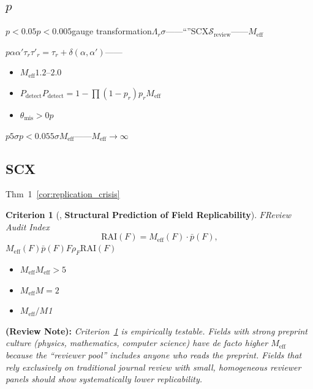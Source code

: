 \documentclass[12pt,a4paper]{article}
\newtheorem{criterion}[theorem]{Criterion}
\theoremstyle{remark}
\newcommand{\reviewSurf}{\mathcal{S}_{\text{review}}}
\newcommand{\misalignAngle}{\theta_{\text{mis}}}
\newcommand{\detectProb}{P_{\text{detect}}}
\newcommand{\reviewnote}[1]{%
    \medskip\noindent
    \textbf{ (Review Note):} \textit{#1}%
}
\begin{document}
\subsection{$p$}

$p < 0.05$$p < 0.005$\textbf{}gauge transformation$\Lambda_r$$\sigma$——``''SCX$\reviewSurf$\textit{}\textit{}——$M_{\text{eff}}$

$p$$\alpha$$\alpha'$$\tau_r$$\tau'_r = \tau_r + \delta(\alpha, \alpha')$\textit{}——
\begin{itemize}
    \item $M_{\text{eff}}$$1.2$--$2.0$
    \item $\detectProb$$\detectProb = 1 - \prod(1-p_r)$$p_r$$M_{\text{eff}}$
    \item $\misalignAngle > 0$$p$
\end{itemize}

\begin{honestcrit}{$p$$5\sigma$$p < 0.05$$5\sigma$$M_{\text{eff}}$——\textit{}$M_{\text{eff}} \to \infty$}
\end{honestcrit}

\subsection{SCX}

Thm~1~\ref{cor:replication_crisis}

\begin{criterion}[, \textbf{Structural Prediction of Field Replicability}]
\label{criterion:replicability}
$F$\textbf{}Review Audit Index
\begin{equation}
    \text{RAI}(F) = M_{\text{eff}}(F) \cdot \bar{p}(F),
    \label{eq:RAI}
\end{equation}
$M_{\text{eff}}(F)$$\bar{p}(F)$$F$$\rho_F$$\text{RAI}(F)$
\begin{itemize}
    \item $M_{\text{eff}}$$M_{\text{eff}} > 5$
    \item $M_{\text{eff}}$$M=2$
    \item $M_{\text{eff}}/M$1
\end{itemize}
\end{criterion}

\reviewnote{Criterion~\ref{criterion:replicability} is empirically testable. Fields with strong preprint culture (physics, mathematics, computer science) have de facto higher $M_{\text{eff}}$ because the ``reviewer pool'' includes anyone who reads the preprint. Fields that rely exclusively on traditional journal review with small, homogeneous reviewer panels should show systematically lower replicability.}
\end{document}
